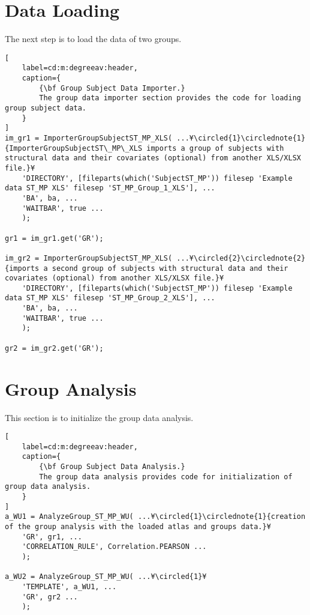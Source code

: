 \documentclass{tufte-handout}
\begin{document}
\section{Data Loading}
The next step is to load the data of two groups.
\begin{lstlisting}[
	label=cd:m:degreeav:header,
	caption={
		{\bf Group Subject Data Importer.}
		The group data importer section provides the code for loading group subject data.
	}
]
im_gr1 = ImporterGroupSubjectST_MP_XLS( ...¥\circled{1}\circlednote{1}{ImporterGroupSubjectST\_MP\_XLS imports a group of subjects with structural data and their covariates (optional) from another XLS/XLSX file.}¥
    'DIRECTORY', [fileparts(which('SubjectST_MP')) filesep 'Example data ST_MP XLS' filesep 'ST_MP_Group_1_XLS'], ...
    'BA', ba, ...
    'WAITBAR', true ...
    );

gr1 = im_gr1.get('GR');

im_gr2 = ImporterGroupSubjectST_MP_XLS( ...¥\circled{2}\circlednote{2}{imports a second group of subjects with structural data and their covariates (optional) from another XLS/XLSX file.}¥
    'DIRECTORY', [fileparts(which('SubjectST_MP')) filesep 'Example data ST_MP XLS' filesep 'ST_MP_Group_2_XLS'], ...
    'BA', ba, ...
    'WAITBAR', true ...
    );

gr2 = im_gr2.get('GR');

\end{lstlisting}
\clearpage

\section{Group Analysis}
This section is to initialize the group data analysis.
\begin{lstlisting}[
	label=cd:m:degreeav:header,
	caption={
		{\bf Group Subject Data Analysis.}
		The group data analysis provides code for initialization of group data analysis.
	}
]
a_WU1 = AnalyzeGroup_ST_MP_WU( ...¥\circled{1}\circlednote{1}{creation of the group analysis with the loaded atlas and groups data.}¥
    'GR', gr1, ...
    'CORRELATION_RULE', Correlation.PEARSON ...
    );

a_WU2 = AnalyzeGroup_ST_MP_WU( ...¥\circled{1}¥
    'TEMPLATE', a_WU1, ...
    'GR', gr2 ...
    );

\end{lstlisting}
\end{document}
